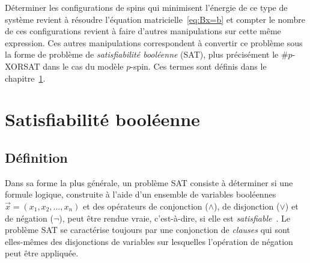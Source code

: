 Déterminer les configurations de spins qui minimisent l'énergie de ce type de système revient à résoudre l'équation matricielle~\ref{eq:Bx=b} et compter le nombre de ces configurations revient à faire d'autres manipulations sur cette même expression.
Ces autres manipulations correspondent à convertir ce problème sous la forme de problème de \emph{satisfiabilité booléenne} (SAT), plus précisément le \#$p$-XORSAT dans le cas du modèle $p$-spin.
Ces termes sont définis dans le chapitre~\ref{ch:SAT}.



\chapter{Satisfiabilité booléenne} \label{ch:SAT}

\section{Définition}\label{sec:def-SAT}
Dans sa forme la plus générale, un problème SAT consiste à déterminer si une formule logique, construite à l'aide d'un ensemble de variables booléennes $\vec{x} = (x_1, x_2, ..., x_n)$ et des opérateurs de conjonction ($\wedge$), de disjonction ($\vee$) et de négation ($\neg$), peut être rendue vraie, c'est-à-dire, si elle est \textit{satisfiable}~\cite{garey1979computers}.
Le problème SAT se caractérise toujours par une conjonction de \emph{clauses} qui sont elles-mêmes des disjonctions de variables sur lesquelles l'opération de négation peut être appliquée.

